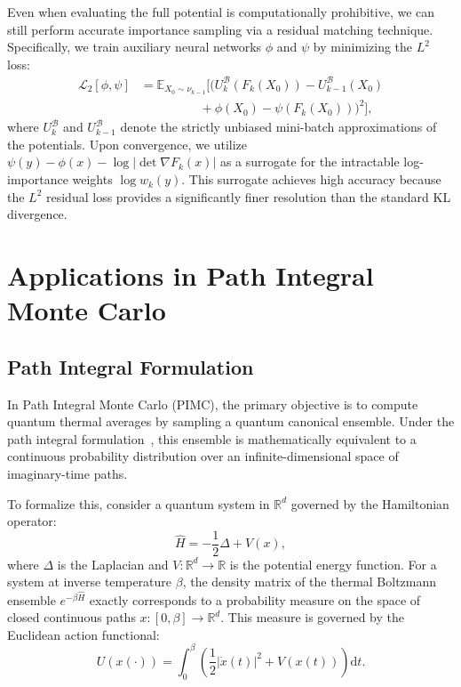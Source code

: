 \documentclass[%
 reprint,
 amsmath,amssymb,
 aps,
 pre,
]{revtex4-2}
\newcommand{\D}{\mathrm{d}}
\begin{document}
Even when evaluating the full potential is computationally prohibitive, we can still perform accurate importance sampling via a residual matching technique. Specifically, we train auxiliary neural networks $\phi$ and $\psi$ by minimizing the $L^2$ loss:
\begin{align*}
    \mathcal{L}_2[\phi, \psi] & = \mathbb{E}_{X_0 \sim \nu_{k-1}} \Big[ \big( U_k^{\mathcal{B}}(F_k(X_0)) - U_{k-1}^{\mathcal{B}}(X_0) \\
    & \hspace{2cm} + \phi(X_0) - \psi(F_k(X_0)) \big)^2 \Big],
\end{align*}
where $U_k^{\mathcal{B}}$ and $U_{k-1}^{\mathcal{B}}$ denote the strictly unbiased mini-batch approximations of the potentials. Upon convergence, we utilize $\psi(y) - \phi(x) - \log |\det \nabla F_k(x)|$ as a surrogate for the intractable log-importance weights $\log w_k(y)$. This surrogate achieves high accuracy because the $L^2$ residual loss provides a significantly finer resolution than the standard KL divergence.

\section{Applications in Path Integral Monte Carlo}
\label{section: PIMC}

\subsection{Path Integral Formulation}

In Path Integral Monte Carlo (PIMC), the primary objective is to compute quantum thermal averages by sampling a quantum canonical ensemble. Under the path integral formulation~\cite{reed1972methods}, this ensemble is mathematically equivalent to a continuous probability distribution over an infinite-dimensional space of imaginary-time paths.

To formalize this, consider a quantum system in $\mathbb{R}^d$ governed by the Hamiltonian operator:
\begin{equation}
    \hat{H} = -\frac{1}{2} \Delta + V(x),
\end{equation}
where $\Delta$ is the Laplacian and $V: \mathbb{R}^d \to \mathbb{R}$ is the potential energy function. For a system at inverse temperature $\beta$, the density matrix of the thermal Boltzmann ensemble $e^{-\beta \hat{H}}$ exactly corresponds to a probability measure on the space of closed continuous paths $x: [0, \beta] \to \mathbb{R}^d$. This measure is governed by the Euclidean action functional:
\begin{equation}
    U(x(\cdot)) = \int_0^\beta \left( \frac{1}{2} |\dot{x}(t)|^2 + V(x(t)) \right) \D t.
\end{equation}
\end{document}
